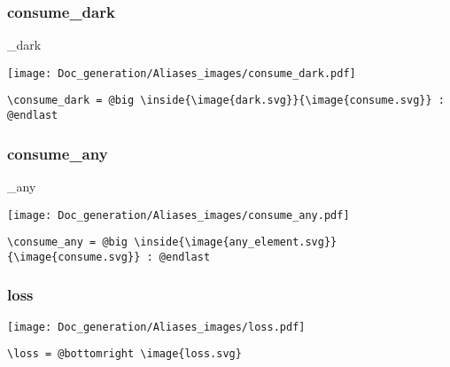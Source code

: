 \documentclass{article}
\begin{document}
\subsubsection{consume\_dark}
\begin{minipage}{0.45\linewidth}
\raggedright
\begin{spverbatim}
\consume_dark
\end{spverbatim}
\end{minipage}
\begin{minipage}{0.45\linewidth}
\raggedleft
\texttt{[image: Doc\_generation/Aliases\_images/consume\_dark.pdf]}
\end{minipage}
\begin{center}
\begin{BVerbatim}
\consume_dark = @big \inside{\image{dark.svg}}{\image{consume.svg}} : @endlast
\end{BVerbatim}
\end{center}

\subsubsection{consume\_any}
\begin{minipage}{0.45\linewidth}
\raggedright
\begin{spverbatim}
\consume_any
\end{spverbatim}
\end{minipage}
\begin{minipage}{0.45\linewidth}
\raggedleft
\texttt{[image: Doc\_generation/Aliases\_images/consume\_any.pdf]}
\end{minipage}
\begin{center}
\begin{BVerbatim}
\consume_any = @big \inside{\image{any_element.svg}}{\image{consume.svg}} : @endlast
\end{BVerbatim}
\end{center}

\subsubsection{loss}
\begin{minipage}{0.45\linewidth}
\raggedright
\begin{spverbatim}
\loss
\end{spverbatim}
\end{minipage}
\begin{minipage}{0.45\linewidth}
\raggedleft
\texttt{[image: Doc\_generation/Aliases\_images/loss.pdf]}
\end{minipage}
\begin{center}
\begin{BVerbatim}
\loss = @bottomright \image{loss.svg}
\end{BVerbatim}
\end{center}
\end{document}
